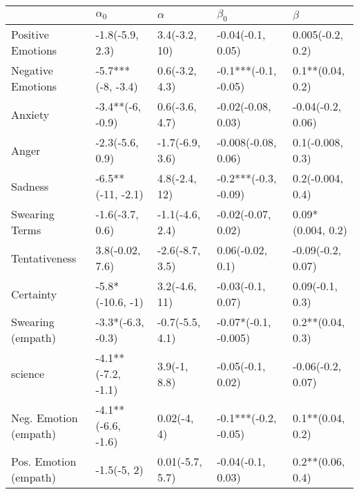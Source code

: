 \begin{tabular}{lllll}
\toprule
{} &          $\alpha_0$ &         $\alpha$ &             $\beta_0$ &            $\beta$ \\
\midrule
Positive Emotions     &     -1.8(-5.9, 2.3) &    3.4(-3.2, 10) &     -0.04(-0.1, 0.05) &   0.005(-0.2, 0.2) \\
Negative Emotions     &   -5.7***(-8, -3.4) &   0.6(-3.2, 4.3) &  -0.1***(-0.1, -0.05) &   0.1**(0.04, 0.2) \\
Anxiety               &    -3.4**(-6, -0.9) &   0.6(-3.6, 4.7) &    -0.02(-0.08, 0.03) &  -0.04(-0.2, 0.06) \\
Anger                 &     -2.3(-5.6, 0.9) &  -1.7(-6.9, 3.6) &   -0.008(-0.08, 0.06) &   0.1(-0.008, 0.3) \\
Sadness               &   -6.5**(-11, -2.1) &    4.8(-2.4, 12) &  -0.2***(-0.3, -0.09) &   0.2(-0.004, 0.4) \\
Swearing Terms        &     -1.6(-3.7, 0.6) &  -1.1(-4.6, 2.4) &    -0.02(-0.07, 0.02) &  0.09*(0.004, 0.2) \\
Tentativeness         &     3.8(-0.02, 7.6) &  -2.6(-8.7, 3.5) &      0.06(-0.02, 0.1) &  -0.09(-0.2, 0.07) \\
Certainty             &    -5.8*(-10.6, -1) &    3.2(-4.6, 11) &     -0.03(-0.1, 0.07) &    0.09(-0.1, 0.3) \\
Swearing (empath)     &   -3.3*(-6.3, -0.3) &  -0.7(-5.5, 4.1) &  -0.07*(-0.1, -0.005) &   0.2**(0.04, 0.3) \\
science               &  -4.1**(-7.2, -1.1) &     3.9(-1, 8.8) &     -0.05(-0.1, 0.02) &  -0.06(-0.2, 0.07) \\
Neg. Emotion (empath) &  -4.1**(-6.6, -1.6) &      0.02(-4, 4) &  -0.1***(-0.2, -0.05) &   0.1**(0.04, 0.2) \\
Pos. Emotion (empath) &         -1.5(-5, 2) &  0.01(-5.7, 5.7) &     -0.04(-0.1, 0.03) &   0.2**(0.06, 0.4) \\
\bottomrule
\end{tabular}
